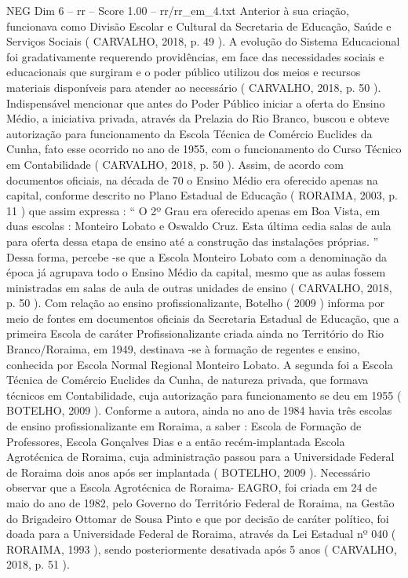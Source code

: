 \begin{textsample}{NEG Dim 6 – rr – Score 1.00 – rr/rr\_em\_4.txt}
Anterior à sua criação, funcionava como Divisão Escolar e Cultural da Secretaria de Educação, Saúde e Serviços Sociais ( CARVALHO, 2018, p. 49 ).
A evolução do Sistema Educacional foi gradativamente requerendo providências, em face das necessidades sociais e educacionais que surgiram e o poder público utilizou dos meios e recursos materiais disponíveis para atender ao necessário ( CARVALHO, 2018, p. 50 ).
Indispensável mencionar que antes do Poder Público iniciar a oferta do Ensino Médio, a iniciativa privada, através da Prelazia do Rio Branco, buscou e obteve autorização para funcionamento da Escola Técnica de Comércio Euclides da Cunha, fato esse ocorrido no ano de 1955, com o funcionamento do Curso Técnico em Contabilidade ( CARVALHO, 2018, p. 50 ).
Assim, de acordo com documentos oficiais, na década de 70 o Ensino Médio era oferecido apenas na capital, conforme descrito no Plano Estadual de Educação ( RORAIMA, 2003, p. 11 ) que assim expressa : “ O 2º Grau era oferecido apenas em Boa Vista, em duas escolas : Monteiro Lobato e Oswaldo Cruz.
Esta última cedia salas de aula para oferta dessa etapa de ensino até a construção das instalações próprias. ” Dessa forma, percebe -se que a Escola Monteiro Lobato com a denominação da época já agrupava todo o Ensino Médio da capital, mesmo que as aulas fossem ministradas em salas de aula de outras unidades de ensino ( CARVALHO, 2018, p. 50 ).
Com relação ao ensino profissionalizante, Botelho ( 2009 ) informa por meio de fontes em documentos oficiais da Secretaria Estadual de Educação, que a primeira Escola de caráter Profissionalizante criada ainda no Território do Rio Branco/Roraima, em 1949, destinava -se à formação de regentes e ensino, conhecida por Escola Normal Regional Monteiro Lobato.
A segunda foi a Escola Técnica de Comércio Euclides da Cunha, de natureza privada, que formava técnicos em Contabilidade, cuja autorização para funcionamento se deu em 1955 ( BOTELHO, 2009 ).
Conforme a autora, ainda no ano de 1984 havia três escolas de ensino profissionalizante em Roraima, a saber : Escola de Formação de Professores, Escola Gonçalves Dias e a então recém-implantada Escola Agrotécnica de Roraima, cuja administração passou para a Universidade Federal de Roraima dois anos após ser implantada ( BOTELHO, 2009 ).
Necessário observar que a Escola Agrotécnica de Roraima- EAGRO, foi criada em 24 de maio do ano de 1982, pelo Governo do Território Federal de Roraima, na Gestão do Brigadeiro Ottomar de Sousa Pinto e que por decisão de caráter político, foi doada para a Universidade Federal de Roraima, através da Lei Estadual nº 040 ( RORAIMA, 1993 ), sendo posteriormente desativada após 5 anos ( CARVALHO, 2018, p. 51 ).

\end{textsample}
